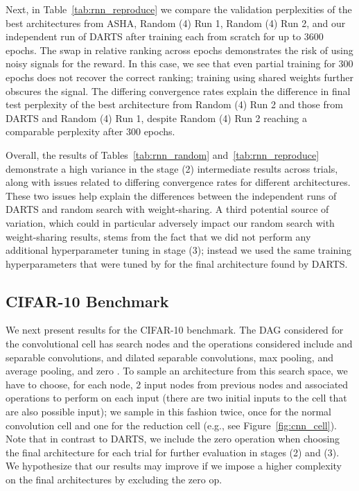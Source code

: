 \documentclass[acmlarge, nonacm]{acmart}
\begin{document}
Next, in Table~\ref{tab:rnn_reproduce} we compare the validation perplexities of 
the best architectures from ASHA, Random (4) Run 1, Random (4) Run 2, and our independent run of DARTS after
training each from scratch for up to 3600 epochs.  The swap in relative ranking across epochs demonstrates the risk of using noisy signals for the reward. In this case, we see that even partial training for 300 epochs does not recover the correct ranking; training using shared weights further obscures the signal. The differing convergence rates explain the difference in final test perplexity of the best architecture from Random (4) Run 2 and those from DARTS and Random (4) Run 1, despite Random (4) Run 2 reaching a comparable perplexity after 300 epochs. 

Overall, the results of Tables~\ref{tab:rnn_random} and~\ref{tab:rnn_reproduce} demonstrate a high variance in the stage (2) intermediate results across trials, along with issues related to differing convergence rates for different architectures. These two issues help explain the differences between the independent runs of DARTS and random search with weight-sharing.  A third potential source of variation, which could in particular adversely impact our random search with weight-sharing results, stems from the fact that we did not perform any additional hyperparameter tuning in stage (3); instead we used the same training hyperparameters that were tuned by \citet{liu2018darts} for the final architecture found by DARTS.

\subsection{CIFAR-10 Benchmark}
\label{ssec:cnn}
We next present results for the CIFAR-10 benchmark. The DAG considered for the convolutional cell has  search nodes and the operations considered include  and  separable convolutions,  and  dilated separable convolutions,  max pooling, and  average pooling, and zero \citep{liu2018darts}.  To sample an architecture from this search space, we have to choose, for each node, 2 input nodes from previous nodes and associated operations to perform on each input (there are two initial inputs to the cell that are also possible input); we sample in this fashion twice, once for the normal convolution cell and one for the reduction cell (e.g., see Figure~\ref{fig:cnn_cell}).  Note that in contrast to DARTS, we include the zero operation when choosing the final architecture for each trial for further evaluation in stages (2) and (3).  We hypothesize that our results may improve if we impose a higher complexity on the final architectures by excluding the zero op.  
\end{document}
